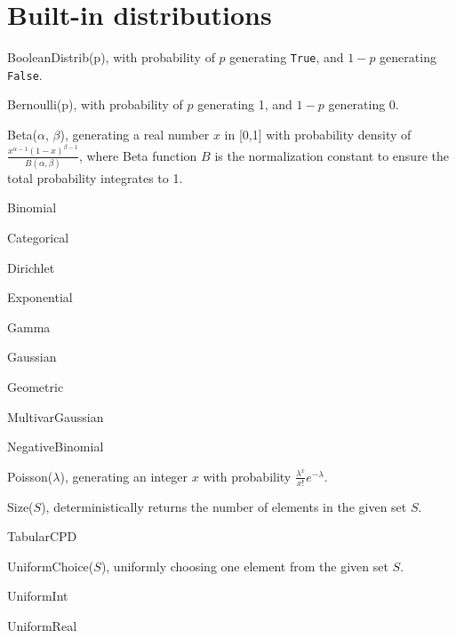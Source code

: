 \documentclass[12pt]{article}
\begin{document}
\section{Built-in distributions}
\begin{itemize*}
\item BooleanDistrib(p), with probability of $p$ generating \verb|True|, and $1-p$ generating \verb|False|.
\item Bernoulli(p), with probability of $p$ generating 1, and $1-p$ generating 0.
\item Beta($\alpha$, $\beta$), generating a real number $x$ in [0,1] with probability density of $\frac{x^{\alpha - 1} (1-x)^{\beta - 1}}{B(\alpha, \beta)}$, where Beta function $B$ is the normalization constant to ensure the total probability integrates to 1.
\item Binomial
\item Categorical
\item Dirichlet
\item Exponential
\item Gamma
\item Gaussian
\item Geometric
\item MultivarGaussian
\item NegativeBinomial
\item Poisson($\lambda$), generating an integer $x$ with probability $\frac{\lambda^x}{x!}e^{-\lambda}$.
\item Size($S$), deterministically returns the number of elements in the given set $S$.
\item TabularCPD
\item UniformChoice($S$), uniformly choosing one element from the given set $S$.
\item UniformInt
\item UniformReal
\end{itemize*}
\end{document}
